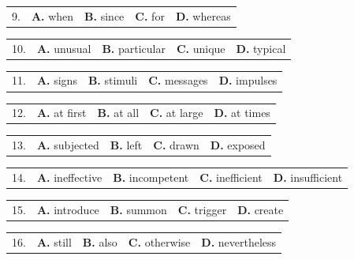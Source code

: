 \documentclass[UTF8,11pt]{ctexart}
\begin{document}
\noindent\begin{tabularx}{\linewidth}{@{}lXXXX@{}}9. & \textbf{A.} when & \textbf{B.} since & \textbf{C.} for & \textbf{D.} whereas\\\end{tabularx}\par

\noindent\begin{tabularx}{\linewidth}{@{}lXXXX@{}}10. & \textbf{A.} unusual & \textbf{B.} particular & \textbf{C.} unique & \textbf{D.} typical\\\end{tabularx}\par

\noindent\begin{tabularx}{\linewidth}{@{}lXXXX@{}}11. & \textbf{A.} signs & \textbf{B.} stimuli & \textbf{C.} messages & \textbf{D.} impulses\\\end{tabularx}\par

\noindent\begin{tabularx}{\linewidth}{@{}lXXXX@{}}12. & \textbf{A.} at first & \textbf{B.} at all & \textbf{C.} at large & \textbf{D.} at times\\\end{tabularx}\par

\noindent\begin{tabularx}{\linewidth}{@{}lXXXX@{}}13. & \textbf{A.} subjected & \textbf{B.} left & \textbf{C.} drawn & \textbf{D.} exposed\\\end{tabularx}\par

\noindent\begin{tabularx}{\linewidth}{@{}lXXXX@{}}14. & \textbf{A.} ineffective & \textbf{B.} incompetent & \textbf{C.} inefficient & \textbf{D.} insufficient\\\end{tabularx}\par

\noindent\begin{tabularx}{\linewidth}{@{}lXXXX@{}}15. & \textbf{A.} introduce & \textbf{B.} summon & \textbf{C.} trigger & \textbf{D.} create\\\end{tabularx}\par

\noindent\begin{tabularx}{\linewidth}{@{}lXXXX@{}}16. & \textbf{A.} still & \textbf{B.} also & \textbf{C.} otherwise & \textbf{D.} nevertheless\\\end{tabularx}\par
\end{document}

